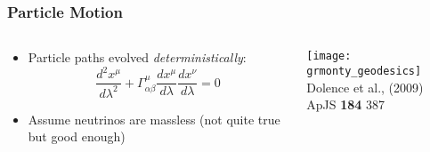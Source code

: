 \documentclass[]{beamer}
\newcommand{\backupend}{
   \setcounter{framenumber}{\value{finalframe}}
}
\begin{document}
\begin{frame}
  \frametitle{Particle Motion}
  \begin{columns}
    \begin{column}{6cm}
      \begin{itemize}
      \item Particle paths evolved \textit{deterministically}:
        $$\frac{d^2 x^\mu}{d\lambda^2} + \Gamma^\mu_{\alpha\beta} \frac{d x^\mu}{d\lambda} \frac{d x^\nu}{d \lambda} = 0$$
      \item Assume neutrinos are massless (not quite true but good enough)
      \end{itemize}
    \end{column}
    \begin{column}{6cm}
      \begin{center}
        \texttt{[image: grmonty\_geodesics]}\\
        {\tiny Dolence et al., (2009) ApJS \textbf{184} 387}
      \end{center}
    \end{column}
  \end{columns}
\end{frame}


\backupend
\end{document}
